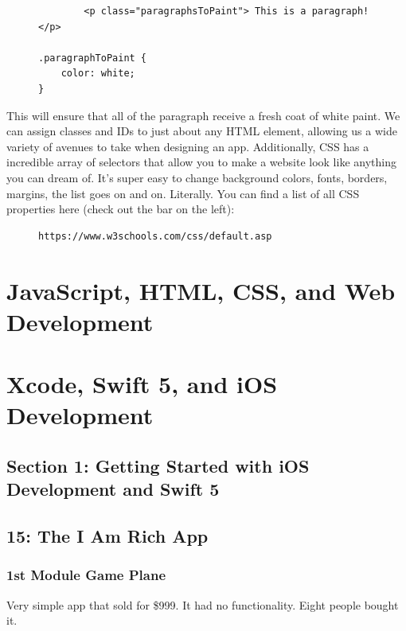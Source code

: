 \documentclass[12pt, letterpaper]{article}
\begin{document}
\begin{figure}
\centering
\begin{BVerbatim}
        <p class="paragraphsToPaint"> This is a paragraph! </p>

.paragraphToPaint {
    color: white;
}
\end{BVerbatim}
\end{figure}

This will ensure that all of the paragraph receive a fresh coat of white paint. We can assign classes and IDs to just
about any HTML element, allowing us a wide variety of avenues to take when designing an app. Additionally, CSS has a
incredible array of selectors that allow you to make a website look like anything you can dream of. It's super easy
to change background colors, fonts, borders, margins, the list goes on and on. Literally. You can find a list of
all CSS properties here (check out the bar on the left):

\begin{figure}[ht]
\centering
\begin{BVerbatim}
https://www.w3schools.com/css/default.asp
\end{BVerbatim}
\end{figure}

\section{JavaScript, HTML, CSS, and Web Development}

\section{Xcode, Swift 5, and iOS Development}

\subsection*{Section 1: Getting Started with iOS Development and Swift 5}

\subsection*{15: The I Am Rich App}

\subsubsection*{1st Module Game Plane}

Very simple app that sold for \$999. It had no functionality. Eight people bought it. \\
\end{document}
